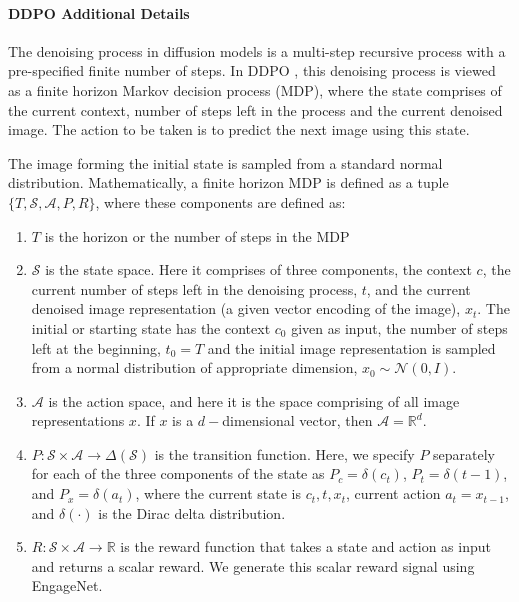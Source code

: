 \paragraph{DDPO Additional Details}

The denoising process in diffusion models is a multi-step recursive process with a pre-specified finite number of steps. In DDPO \citet{black2023training}, this denoising process is viewed as a finite horizon Markov decision process (MDP), where the state comprises of the current context, number of steps left in the process and the current denoised image. The action to be taken is to predict the next image using this state. 

 The image forming the initial state is sampled from a standard normal distribution. Mathematically, a finite horizon MDP is defined as a tuple $\{T, \mathcal{S}, \mathcal{A}, P, R\}$, where these components are defined as: 
 
 \begin{enumerate}
     \item $T$ is the horizon or the number of steps in the MDP
     \item $\mathcal{S}$ is the state space. Here it comprises of three components, the context $c$, the current number of steps left in the denoising process, $t$, and the current denoised image representation (a given vector encoding of the image), $x_t$. The initial or starting state has the context $c_0$ given as input, the number of steps left at the beginning, $t_0 = T$ and the initial image representation is sampled from a normal distribution of appropriate dimension, $x_0 \sim \mathcal{N}(0, I)$.
     \item $\mathcal{A}$ is the action space, and here it is the space comprising of all image representations $x$. If $x$ is a $d-$dimensional vector, then $\mathcal{A} = \mathbb{R}^d$.
     \item $P: \mathcal{S} \times \mathcal{A} \to \Delta(\mathcal{S})$ is the transition function. Here, we specify $P$ separately for each of the three components of the state as $P_c = \delta(c_t)$, $P_t = \delta(t-1)$, and $P_x = \delta(a_t)$, where the current state is $c_t, t, x_t$, current action $a_t = x_{t-1}$, and $\delta(\cdot)$ is the Dirac delta distribution.
     \item $R: \mathcal{S} \times \mathcal{A} \to \mathbb{R}$ is the reward function that takes a state and action as input and returns a scalar reward. We generate this scalar reward signal using EngageNet.
 \end{enumerate}

